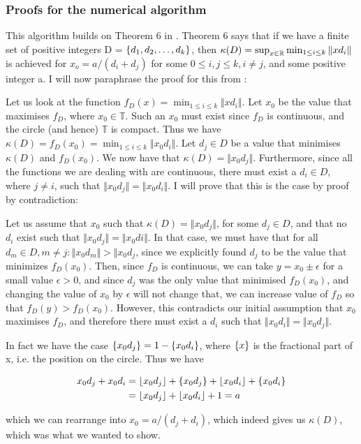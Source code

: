 \subsubsection{Proofs for the numerical algorithm}
\label{proof_num}
\begin{theo}[Correctness:]
This algorithm builds on Theorem 6 in \cite{invis}. Theorem 6 says that if we have a finite set of positive integers D = $\{d_1, d_2, \ldots, d_k\}$, then  $\kappa(D) = \sup_{x \in \mathbb{R}}\min_{1\leq i \leq k}\Vert x d_i \Vert$ is achieved for $x_o = a/(d_i + d_j)$ for some $0 \leq i,j \leq k, i \neq j$, and some positive integer a. I will now paraphrase the proof for this from \cite{invis}:

Let us look at the function $f_D(x) = \min_{1 \leq i \leq k}\Vert x d_i \Vert$. Let $x_0$ be the value that maximises $f_D$, where $x_0 \in \mathbb{T}$. Such an $x_0$ must exist since $f_D$ is continuous, and the circle (and hence) $\mathbb{T}$ is compact. Thus we have $\kappa(D) = f_D(x_0) = \min_{1 \leq i \leq k} \Vert x_0 d_i \Vert$. Let $d_j \in D$ be a value that minimises $\kappa(D)$ and $f_D(x_0)$. We now have that $\kappa(D) = \Vert x_0 d_j\Vert$. 
Furthermore, since all the functions we are dealing with are continuous, there must exist a $d_i \in D$, where $j \neq i$, such that $\Vert x_0 d_j \Vert = \Vert x_0 d_i \Vert$. I will prove that this is the case by proof by contradiction:

Let us assume that $x_0$ such that $\kappa(D) = \Vert x_0 d_j \Vert$, for some $d_j \in D$, and that no $d_i$ exist such that $\Vert x_0 d_j \Vert = \Vert x_0 di\Vert$. In that case, we must have that for all $d_m \in D, m \neq j: \Vert x_0 d_m \Vert > \Vert x_0 d_j$, since we explicitly found $d_j$ to be the value that minimizes $f_D(x_0)$. Then, since $f_D$ is continuous, we can take $y = x_0 \pm \epsilon$ for a small value $\epsilon > 0$, and since $d_j$ was the only value that minimised $f_D(x_0)$, and changing the value of $x_0$ by $\epsilon$ will not change that, we can increase value of $f_D$ so that $f_D(y) > f_D(x_0)$. However, this contradicts our initial assumption that $x_0$ maximises $f_D$, and therefore there must exist a $d_i$ such that $\Vert x_0 d_i \Vert = \Vert x_0 d_j \Vert$.  
 
In fact we have the case $\{x_0 d_j\} = 1 - \{x_0 d_i\}$, where $\{x\}$ is the fractional part of x, i.e. the position on the circle. Thus we have 

\begin{equation}
\begin{split}
x_0d_j + x_0d_i &= \lfloor x_0d_j \rfloor + \{x_0d_j\} + \lfloor x_0d_i \rfloor + \{x_0d_i\} \\
               &= \lfloor x_0d_j \rfloor + \lfloor x_0d_i \rfloor + 1 = a
\end{split} 
\end{equation}

which we can rearrange into $x_0 = a / (d_j + d_i)$, which indeed gives us $\kappa(D)$, which was what we wanted to show.
\end{theo}

